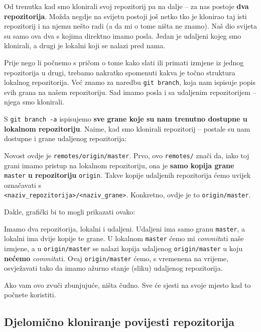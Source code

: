 Od trenutka kad smo klonirali svoj repozitorij pa na dalje -- za nas postoje \textbf{dva repozitorija}.
Možda negdje na svijetu postoji još netko tko je klonirao taj isti repozitorij i na njemu nešto radi (a da mi o tome ništa ne znamo).
Naš dio svijeta su samo ova dva s kojima direktno imamo posla. 
Jedan je udaljeni kojeg smo klonirali, a drugi je lokalni koji se nalazi pred nama.

Prije nego li počnemo s pričom o tome kako slati ili primati izmjene iz jednog repozitorija u drugi, trebamo nakratko spomenuti kakva je točno struktura lokalnog repozitorija.
Već znamo za naredbu \verb+git branch+, koja nam ispisuje popis svih grana na našem repozitoriju.
Sad imamo posla i sa udaljenim repozitorijem -- njega smo klonirali.

S \verb+git branch -a+ ispisujemo \textbf{sve grane koje su nam trenutno dostupne u lokalnom repozitoriju}.
Naime, kad smo klonirali repozitorij -- postale su nam dostupne i grane udaljenog repozitorija:



Novost ovdje je \verb+remotes/origin/master+.
Prvo, ovo \verb+remotes/+ znači da, iako toj grani imamo pristup na lokalnom repozitoriju, ona je \textbf{samo kopija grane} \verb+master+ \textbf{u repozitoriju} \verb+origin+.
Takve kopije udaljenih repozitorija ćemo uvijek označavati s \\ \verb+<naziv_repozitorija>/<naziv_grane>+.
Konkretno, ovdje je to \verb+origin/master+.

Dakle, grafički bi to mogli prikazati ovako:



Imamo dva repozitorija, lokalni i udaljeni.
Udaljeni ima samo granu \verb+master+, a lokalni ima dvije kopije te grane. 
U lokalnom \verb+master+ ćemo mi \emph{commit}ati naše izmjene, a u \verb+origin/master+ se nalazi kopija udaljenog \verb+origin/master+ u koju \textbf{nećemo} \emph{commit}ati.
Ovaj \verb+origin/master+ ćemo, s vremenena na vrijeme, osvježavati tako da imamo ažurno stanje (sliku) udaljenog repozitorija.

Ako vam ovo zvuči zbunjujuće, ništa čudno.
Sve će sjesti na svoje mjesto kad to počnete koristiti.

\subsection*{Djelomično kloniranje povijesti repozitorija}

